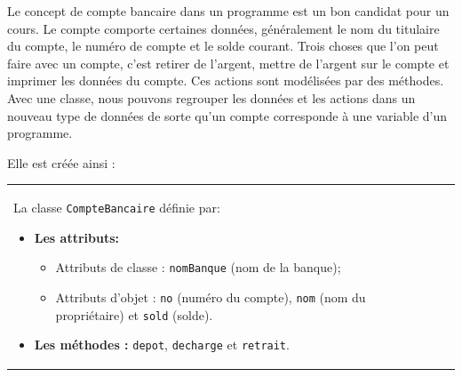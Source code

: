 \documentclass[a4paper,11pt]{article}
\theoremstyle{mytheor}
\begin{document}
Le concept de compte bancaire dans un programme est un bon candidat pour un cours. Le compte comporte certaines données, généralement le nom du titulaire du compte, le numéro de compte et le solde courant. Trois choses que l'on peut faire avec un compte, c'est retirer de l'argent, mettre de l'argent sur le compte et imprimer les données du compte. Ces actions sont modélisées par des méthodes. Avec une classe, nous pouvons regrouper les données et les actions dans un nouveau type de données de sorte qu'un compte corresponde à une variable d'un programme.

Elle est créée ainsi :


\noindent

\begin{tabular}{ll}	
	\begin{minipage}{.5\linewidth}
		La classe \texttt{CompteBancaire} définie par:
		\begin{itemize}
			\item \textbf{Les attributs:}
			\begin{itemize}
				
				\item Attributs de classe : \texttt{nomBanque} (nom de la banque);
				
				\item Attributs d'objet : \texttt{no} (numéro du compte), \texttt{nom} (nom du propriétaire) et \texttt{sold} (solde).
				
			\end{itemize}
			
			\noindent
			\item \textbf{Les méthodes :} \texttt{depot}, \texttt{decharge} et \texttt{retrait}.
		\end{itemize}
		

\end{minipage}
\end{tabular}
\end{document}
